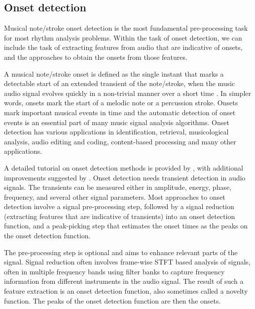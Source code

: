 \subsection{Onset detection}\label{sec:bkgnd:onsetdetect}
Musical note/stroke onset detection is the most fundamental pre-processing task for most rhythm analysis problems. Within the task of onset detection, we can include the task of extracting features from audio that are indicative of onsets, and the approaches to obtain the onsets from those features. 

A musical note/stroke onset is defined as the single instant that marks a detectable start of an extended transient of the note/stroke, when the music audio signal evolves quickly in a non-trivial manner over a short time \cite{bello:05:onset}. In simpler words, onsets mark the start of a melodic note or a percussion stroke. Onsets mark important musical events in time and the automatic detection of onset events is an essential part of many music signal analysis algorithms. Onset detection has various applications in identification, retrieval, musicological analysis, audio editing and coding, content-based processing and many other applications.
 
A detailed tutorial on onset detection methods is provided by , with additional improvements suggested by . Onset detection needs transient detection in audio signals. The transients can be measured either in amplitude, energy, phase, frequency, and several other signal parameters. Most approaches to onset detection involve a signal pre-processing step, followed by a signal reduction (extracting features that are indicative of transients) into an onset detection function, and a peak-picking step that estimates the onset times as the peaks on the onset detection function. 

The pre-processing step is optional and aims to enhance relevant parts of the signal. Signal reduction often involves frame-wise \gls{STFT} based analysis of signals, often in multiple frequency bands using filter banks to capture frequency information from different instruments in the audio signal. The result of such a feature extraction is an onset detection function, also sometimes called a novelty function. The peaks of the onset detection function are then the onsets. 

